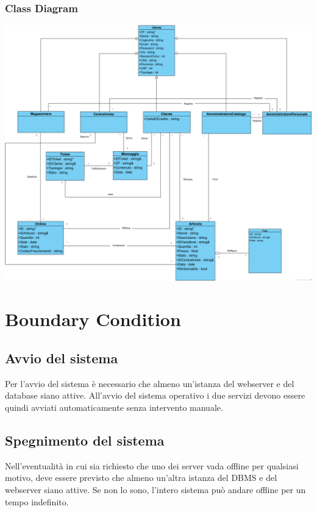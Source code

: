\documentclass[12pt,a4paper]{article}
\begin{document}
\subsubsection{Class Diagram}
\begin{center}
\includegraphics[width=\textwidth]{../../RAD/img/diagrammadiclasse}
\end{center}


\newpage

\section{Boundary Condition}
\subsection{Avvio del sistema}
Per l'avvio del sistema è necessario che almeno un'istanza del webserver e del database siano attive.
All'avvio del sistema operativo i due servizi devono essere quindi avviati automaticamente senza intervento manuale.

\subsection{Spegnimento del sistema}
Nell'eventualità in cui sia richiesto che uno dei server vada offline per qualsiasi motivo, deve essere previsto che almeno un'altra istanza del DBMS e del webserver siano attive. Se non lo sono, l'intero sistema può andare offline per un tempo indefinito.
\end{document}
